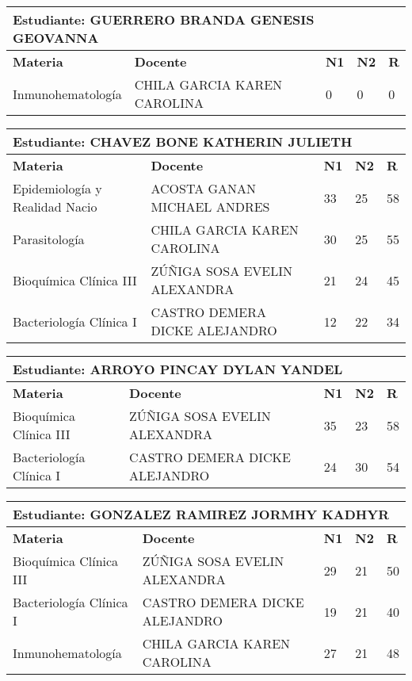 \small
\begin{tabularx}{\textwidth}{|p{5cm}|p{7cm}|X|X|X|}
\hline
\multicolumn{5}{|p{\dimexpr\textwidth-2\tabcolsep-2\arrayrulewidth}|}{\textbf{Estudiante: GUERRERO BRANDA GENESIS GEOVANNA }}\\\hline
\textbf{Materia} & \textbf{Docente} & \textbf{N1} & \textbf{N2} & \textbf{R} \\ \hline
Inmunohematología & CHILA GARCIA KAREN CAROLINA  & 0 & 0& 0 \\ \hline
\end{tabularx}\vspace{10mm}
\small
\begin{tabularx}{\textwidth}{|p{5cm}|p{7cm}|X|X|X|}
\hline
\multicolumn{5}{|p{\dimexpr\textwidth-2\tabcolsep-2\arrayrulewidth}|}{\textbf{Estudiante: CHAVEZ BONE KATHERIN JULIETH }}\\\hline
\textbf{Materia} & \textbf{Docente} & \textbf{N1} & \textbf{N2} & \textbf{R} \\ \hline
Epidemiología y Realidad Nacio & ACOSTA GANAN MICHAEL ANDRES  & 33 & 25& 58 \\ \hline
Parasitología & CHILA GARCIA KAREN CAROLINA  & 30 & 25& 55 \\ \hline
Bioquímica Clínica III & ZÚÑIGA SOSA EVELIN ALEXANDRA  & 21 & 24& 45 \\ \hline
Bacteriología Clínica I & CASTRO DEMERA DICKE ALEJANDRO  & 12 & 22& 34 \\ \hline
\end{tabularx}\vspace{10mm}
\small
\begin{tabularx}{\textwidth}{|p{5cm}|p{7cm}|X|X|X|}
\hline
\multicolumn{5}{|p{\dimexpr\textwidth-2\tabcolsep-2\arrayrulewidth}|}{\textbf{Estudiante: ARROYO PINCAY DYLAN YANDEL }}\\\hline
\textbf{Materia} & \textbf{Docente} & \textbf{N1} & \textbf{N2} & \textbf{R} \\ \hline
Bioquímica Clínica III & ZÚÑIGA SOSA EVELIN ALEXANDRA  & 35 & 23& 58 \\ \hline
Bacteriología Clínica I & CASTRO DEMERA DICKE ALEJANDRO  & 24 & 30& 54 \\ \hline
\end{tabularx}\vspace{10mm}
\small
\begin{tabularx}{\textwidth}{|p{5cm}|p{7cm}|X|X|X|}
\hline
\multicolumn{5}{|p{\dimexpr\textwidth-2\tabcolsep-2\arrayrulewidth}|}{\textbf{Estudiante: GONZALEZ RAMIREZ JORMHY KADHYR }}\\\hline
\textbf{Materia} & \textbf{Docente} & \textbf{N1} & \textbf{N2} & \textbf{R} \\ \hline
Bioquímica Clínica III & ZÚÑIGA SOSA EVELIN ALEXANDRA  & 29 & 21& 50 \\ \hline
Bacteriología Clínica I & CASTRO DEMERA DICKE ALEJANDRO  & 19 & 21& 40 \\ \hline
Inmunohematología & CHILA GARCIA KAREN CAROLINA  & 27 & 21& 48 \\ \hline
\end{tabularx}\vspace{10mm}
